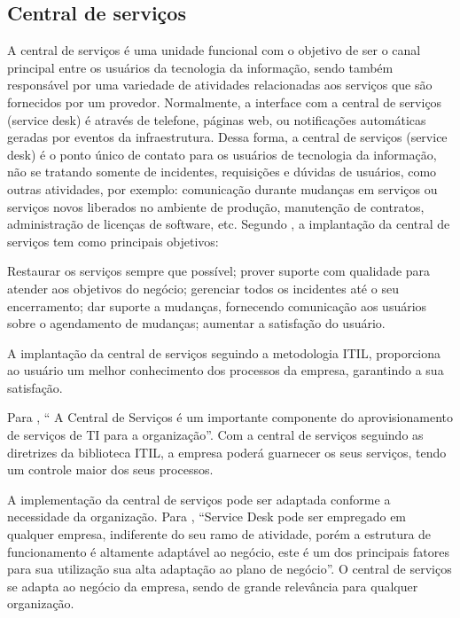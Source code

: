 \documentclass[eso]{bcc}
\begin{document}
\subsection{Central de serviços}

A central de serviços é uma unidade funcional com o objetivo de ser o canal principal entre os usuários da tecnologia da informação, sendo também responsável por uma variedade de atividades relacionadas aos serviços que são fornecidos por um provedor. Normalmente, a interface com a central de serviços (service desk) é através de telefone, páginas web, ou notificações automáticas geradas por eventos da infraestrutura. Dessa forma, a central de serviços (service desk) é o ponto único de contato para os usuários de tecnologia da informação, não se tratando somente de incidentes, requisições e dúvidas de usuários, como outras atividades, por exemplo: comunicação durante mudanças em serviços ou serviços novos liberados no ambiente de produção, manutenção de contratos, administração de licenças de software, etc. Segundo \cite[p. 122]{filho:2011}, a implantação da central de serviços tem como principais objetivos:
\begin{quoting}
{\footnotesize
 Restaurar os serviços sempre que possível; prover suporte com qualidade para atender aos objetivos do negócio; gerenciar todos os incidentes até o seu encerramento; dar suporte a mudanças, fornecendo comunicação aos usuários sobre o agendamento de mudanças; aumentar a satisfação do usuário.
}
\end{quoting}

A implantação da central de serviços seguindo a metodologia ITIL, proporciona ao usuário um melhor conhecimento dos processos da empresa, garantindo a sua satisfação.

Para \cite[p. 69]{magalhaes:2007}, “ A Central de Serviços é um importante componente do aprovisionamento de serviços de TI para a organização”. Com a central de serviços seguindo as diretrizes da biblioteca ITIL, a empresa poderá guarnecer os seus serviços, tendo um controle maior dos seus processos.

A implementação da central de serviços pode ser adaptada conforme a necessidade da organização. Para \cite[p. 82]{scremin:2015}, “Service Desk pode ser empregado em qualquer empresa, indiferente do seu ramo de atividade, porém a estrutura de funcionamento é altamente adaptável ao negócio, este é um dos principais fatores para sua utilização sua alta adaptação ao plano de negócio”. O central de serviços se adapta ao negócio da empresa, sendo de grande relevância para qualquer organização.
\end{document}
